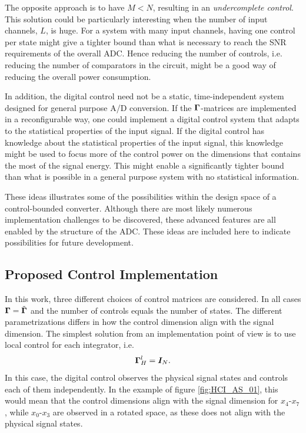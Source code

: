 The opposite approach is to have $M < N$, resulting in an \textit{undercomplete control}. This solution could be particularly interesting when the number of input channels, $L$, is huge. For a system with many input channels, having one control per state might give a tighter bound than what is necessary to reach the SNR requirements of the overall ADC. Hence reducing the number of controls, i.e. reducing the number of comparators in the circuit, might be a good way of reducing the overall power consumption.

In addition, the digital control need not be a static, time-independent system designed for general purpose A/D conversion. If the $\bm{\Gamma}$-matrices are implemented in a reconfigurable way, one could implement a digital control system that adapts to the statistical properties of the input signal. If the digital control has knowledge about the statistical properties of the input signal, this knowledge might be used to focus more of the control power on the dimensions that contains the most of the signal energy. This might enable a significantly tighter bound than what is possible in a general purpose system with no statistical information.

These ideas illustrates some of the possibilities within the design space of a control-bounded converter. Although there are most likely numerous implementation challenges to be discovered, these advanced features are all enabled by the structure of the ADC. These ideas are included here to indicate possibilities for future development.

\subsection{Proposed Control Implementation}
In this work, three different choices of control matrices are considered. In all cases $\bm{\Gamma} = \tilde{\bm{\Gamma}}$ and the number of controls equals the number of states. The different parametrizations differs in how the control dimension align with the signal dimension. The simplest solution from an implementation point of view is to use local control for each integrator, i.e.
\begin{equation}
    \bm{\Gamma}_{H}^l = \bm{I}_{N}.
\end{equation}
In this case, the digital control observes the physical signal states and controls each of them independently. In the example of figure \ref{fig:HCI_AS_01}, this would mean that the control dimensions align with the signal dimension for $x_4$-$x_7$, while $x_0$-$x_3$ are observed in a rotated space, as these does not align with the physical signal states.

